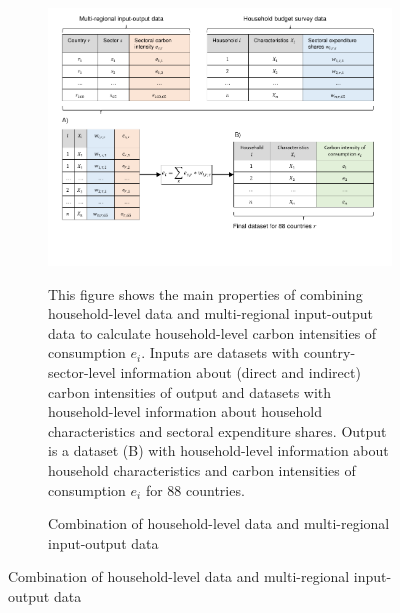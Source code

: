 \begin{figure}[ht!]
  \centering
  \caption{Graphical representation of data work} \label{fig:data_visualisation}
  \begin{subfigure}[b]{\textwidth}
  \centering
  \includegraphics{1_Figures/Figures_Appendix/Graphical representation of data work_1.pdf}
  \caption{Combination of household-level data and multi-regional input-output data} \label{fig:data_visualisation_1}
  \begin{subcaption2}
    This figure shows the main properties of combining household-level data and multi-regional input-output data to calculate household-level carbon intensities of consumption $e_{i}$. Inputs are datasets with country-sector-level information about (direct and indirect) carbon intensities of output and datasets with household-level information about household characteristics and sectoral expenditure shares. Output is a dataset (B) with household-level information about household characteristics and carbon intensities of consumption $e_{i}$ for 88 countries.
  \end{subcaption2}
  \end{subfigure}
\end{figure}

\clearpage

